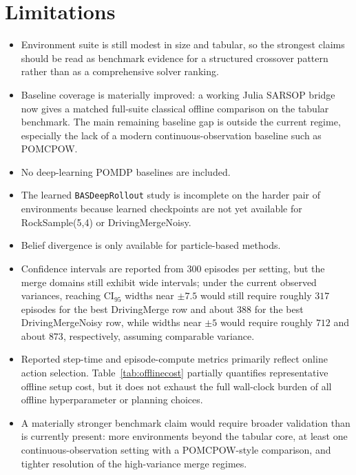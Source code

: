 \documentclass[10pt,twocolumn]{article}
\begin{document}
\section{Limitations}
\begin{itemize}
    \item Environment suite is still modest in size and tabular, so the strongest claims should be read as benchmark evidence for a structured crossover pattern rather than as a comprehensive solver ranking.
    \item Baseline coverage is materially improved: a working Julia SARSOP bridge now gives a matched full-suite classical offline comparison on the tabular benchmark. The main remaining baseline gap is outside the current regime, especially the lack of a modern continuous-observation baseline such as POMCPOW.
    \item No deep-learning POMDP baselines are included.
    \item The learned \texttt{BASDeepRollout} study is incomplete on the harder pair of environments because learned checkpoints are not yet available for RockSample(5,4) or DrivingMergeNoisy.
    \item Belief divergence is only available for particle-based methods.
    \item Confidence intervals are reported from 300 episodes per setting, but the merge domains still exhibit wide intervals; under the current observed variances, reaching CI$_{95}$ widths near $\pm 7.5$ would still require roughly $317$ episodes for the best DrivingMerge row and about $388$ for the best DrivingMergeNoisy row, while widths near $\pm 5$ would require roughly $712$ and about $873$, respectively, assuming comparable variance.
    \item Reported step-time and episode-compute metrics primarily reflect online action selection. Table~\ref{tab:offlinecost} partially quantifies representative offline setup cost, but it does not exhaust the full wall-clock burden of all offline hyperparameter or planning choices.
    \item A materially stronger benchmark claim would require broader validation than is currently present: more environments beyond the tabular core, at least one continuous-observation setting with a POMCPOW-style comparison, and tighter resolution of the high-variance merge regimes.
\end{itemize}
\end{document}
